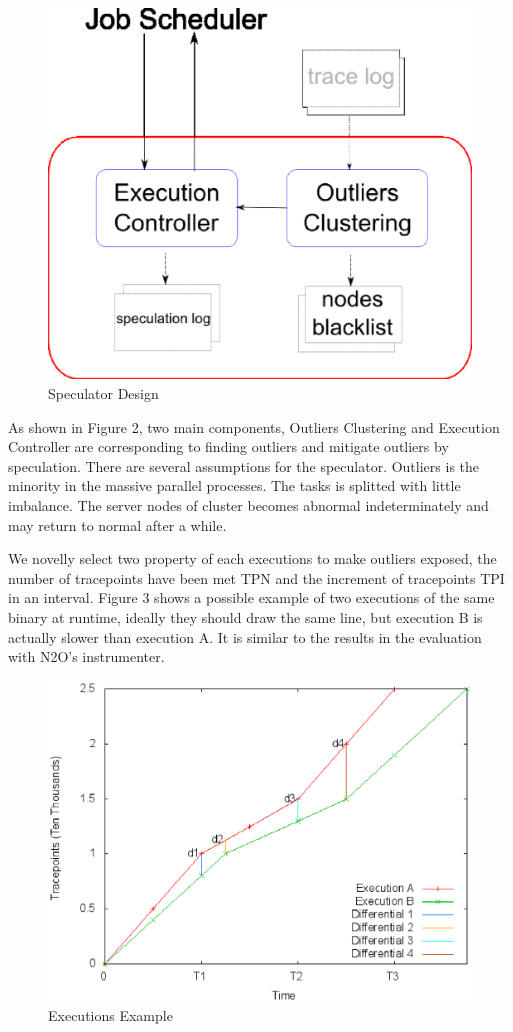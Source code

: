 \begin{figure}
\centering
\includegraphics[width=0.9\columnwidth]{figures/speculator.eps}
\caption{Speculator Design}
\label{figure:speculator}
\end{figure}

As shown in Figure 2, two main components, Outliers Clustering and Execution Controller are corresponding to finding outliers and mitigate outliers by speculation. There are several assumptions for the speculator. Outliers is the minority in the massive parallel processes. The tasks is splitted with little imbalance. The server nodes of cluster becomes abnormal indeterminately and may return to normal after a while.

We novelly select two property of each executions to make outliers exposed, the number of tracepoints have been met TPN and the increment of tracepoints TPI in an interval. Figure 3 shows a possible example of two executions of the same binary at runtime, ideally they should draw the same line, but execution B is actually slower than execution A. It is similar to the results in the evaluation with N2O’s instrumenter. 

\begin{figure}
\centering
\includegraphics[width=0.9\columnwidth]{figures/executions_example.eps}
\caption{Executions Example}
\label{figure:executionsexample}
\end{figure}

